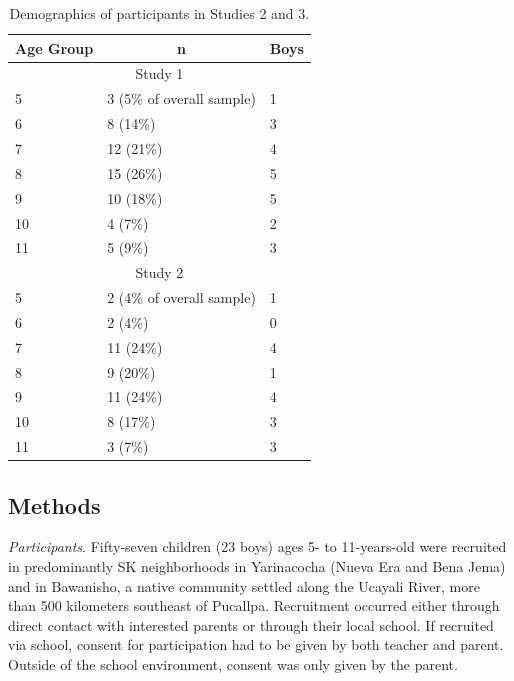 \documentclass[
  english,
  ,man,floatsintext]{apa6}
\begin{document}
\begin{table}[tbp]

\begin{center}
\begin{threeparttable}

\caption{\label{tab:study23-demographics}Demographics of participants in Studies 2 and 3.}

\begin{tabular}{lll}
\toprule
Age Group & \multicolumn{1}{c}{n} & \multicolumn{1}{c}{Boys}\\
\midrule
\multicolumn{3}{c}{Study 1}\\
5 & 3 (5\% of overall sample) & 1\\
6 & 8 (14\%) & 3\\
7 & 12 (21\%) & 4\\
8 & 15 (26\%) & 5\\
9 & 10 (18\%) & 5\\
10 & 4 (7\%) & 2\\
11 & 5 (9\%) & 3\\
\multicolumn{3}{c}{Study 2}\\
5 & 2 (4\% of overall sample) & 1\\
6 & 2 (4\%) & 0\\
7 & 11 (24\%) & 4\\
8 & 9 (20\%) & 1\\
9 & 11 (24\%) & 4\\
10 & 8 (17\%) & 3\\
11 & 3 (7\%) & 3\\
\bottomrule
\end{tabular}

\end{threeparttable}
\end{center}

\end{table}

\hypertarget{methods-1}{%
\subsection{Methods}\label{methods-1}}

\emph{Participants}. Fifty-seven children (23 boys) ages 5- to 11-years-old were recruited in predominantly SK neighborhoods in Yarinacocha (Nueva Era and Bena Jema) and in Bawanisho, a native community settled along the Ucayali River, more than 500 kilometers southeast of Pucallpa. Recruitment occurred either through direct contact with interested parents or through their local school. If recruited via school, consent for participation had to be given by both teacher and parent. Outside of the school environment, consent was only given by the parent.
\end{document}
